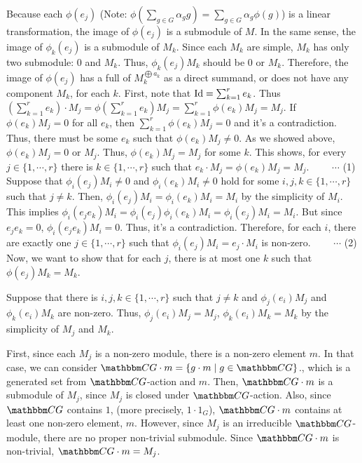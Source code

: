 Because each \(\phi(e_j)\)
(Note: \(\phi(\sum_{g \in G} \alpha_g g) = \sum_{g \in G} \alpha_g \phi(g)\))
is a linear transformation,
the image of \(\phi(e_j)\) is a submodule of \(M\).
In the same sense, the image of \(\phi_k(e_j)\) is a submodule of \(M_k\).
Since each \(M_k\) are simple, \(M_k\) has only two submodule: \(0\) and \(M_k\).
Thus, \(\phi_k(e_j) M_k\) should be \(0\) or \(M_k\).
Therefore, the image of \(\phi(e_j)\) has a full of \(M_k^{\bigoplus a_k}\) as a direct summand, or does not have any component \(M_k\), for each \(k\).
\br
\noindent
First, note that \(\textnormal{Id} = \sum_{k=1}^r e_k\).
Thus \((\sum_{k=1}^r e_k) \cdot M_j = \phi(\sum_{k=1}^r e_k) M_j = \sum_{k=1}^r \phi(e_k) M_j = M_j\).
If \(\phi(e_k) M_j = 0\) for all \(e_k\),
then \(\sum_{k=1}^r \phi(e_k) M_j = 0\)
and it's a contradiction.
Thus, there must be some \(e_k\) such that \(\phi(e_k) M_j \neq 0\).
As we showed above, \(\phi(e_k) M_j = 0\) or \(M_j\).
Thus, \(\phi(e_k) M_j = M_j\) for some \(k\).
This shows, for every \(j \in \{1, \cdots, r\}\)
there is \(k \in \{1, \cdots, r\}\)
such that \(e_k \cdot M_j = \phi(e_k) M_j = M_j\).
\(\qquad\cdots\) (1)
\br
\noindent
Suppose that \(\phi_i(e_j) M_i \neq 0\) and \(\phi_i(e_k) M_i \neq 0\) hold
for some \(i, j, k \in \{1, \cdots, r\}\) such that \(j \neq k\).
Then, \(\phi_i(e_j) M_i = \phi_i(e_k) M_i = M_i\)
by the simplicity of \(M_i\).
This implies \(\phi_i(e_j e_k) M_i = \phi_i(e_j) \phi_i(e_k) M_i = \phi_i(e_j) M_i = M_i\).
But since \(e_j e_k = 0\), \(\phi_i(e_j e_k) M_i = 0\).
Thus, it's a contradiction.
Therefore, for each \(i\), there are exactly one \(j \in \{1, \cdots, r\}\)
such that \(\phi_i(e_j) M_i = e_j \cdot M_i\) is non-zero.
\(\qquad\cdots\) (2)
\br
\noindent
Now, we want to show that for each \(j\),
there is at most one \(k\) such that \(\phi(e_j) M_k = M_k\).

Suppose that there is \(i, j, k \in \{1, \cdots, r\}\)
such that \(j \neq k\) and
\(\phi_j(e_i) M_j\) and \(\phi_k(e_i) M_k\) are non-zero.
Thus, \(\phi_j(e_i) M_j = M_j\), \(\phi_k(e_i) M_k = M_k\)
by the simplicity of \(M_j\) and \(M_k\).

First, since each \(M_j\) is a non-zero module, there is a non-zero element \(m\).
In that case, we can consider \(\bbC G \cdot m = \{g \cdot m \mid g \in \bbC G\}\).,
which is a generated set from \(\bbC G\)-action and \(m\).
Then, \(\bbC G \cdot m\) is a submodule of \(M_j\),
since \(M_j\) is closed under \(\bbC G\)-action.
Also, since \(\bbC G\) contains \(1\), (more precisely, \(1 \cdot 1_G\)),
\(\bbC G \cdot m\) contains at least one non-zero element, \(m\).
However, since \(M_j\) is an irreducible \(\bbC G\)-module,
there are no proper non-trivial submodule.
Since \(\bbC G \cdot m\) is non-trivial, \(\bbC G \cdot m = M_j\).

